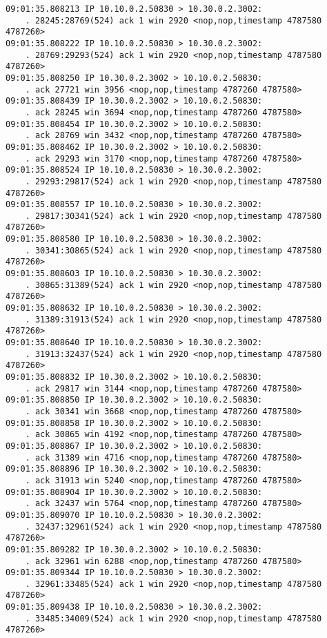 \documentclass[a4paper,12pt]{article}
\begin{document}
\begin{Verbatim}
09:01:35.808213 IP 10.10.0.2.50830 > 10.30.0.2.3002: 
    . 28245:28769(524) ack 1 win 2920 <nop,nop,timestamp 4787580 4787260>
09:01:35.808222 IP 10.10.0.2.50830 > 10.30.0.2.3002: 
    . 28769:29293(524) ack 1 win 2920 <nop,nop,timestamp 4787580 4787260>
09:01:35.808250 IP 10.30.0.2.3002 > 10.10.0.2.50830: 
    . ack 27721 win 3956 <nop,nop,timestamp 4787260 4787580>
09:01:35.808439 IP 10.30.0.2.3002 > 10.10.0.2.50830: 
    . ack 28245 win 3694 <nop,nop,timestamp 4787260 4787580>
09:01:35.808454 IP 10.30.0.2.3002 > 10.10.0.2.50830: 
    . ack 28769 win 3432 <nop,nop,timestamp 4787260 4787580>
09:01:35.808462 IP 10.30.0.2.3002 > 10.10.0.2.50830: 
    . ack 29293 win 3170 <nop,nop,timestamp 4787260 4787580>
09:01:35.808524 IP 10.10.0.2.50830 > 10.30.0.2.3002: 
    . 29293:29817(524) ack 1 win 2920 <nop,nop,timestamp 4787580 4787260>
09:01:35.808557 IP 10.10.0.2.50830 > 10.30.0.2.3002: 
    . 29817:30341(524) ack 1 win 2920 <nop,nop,timestamp 4787580 4787260>
09:01:35.808580 IP 10.10.0.2.50830 > 10.30.0.2.3002: 
    . 30341:30865(524) ack 1 win 2920 <nop,nop,timestamp 4787580 4787260>
09:01:35.808603 IP 10.10.0.2.50830 > 10.30.0.2.3002: 
    . 30865:31389(524) ack 1 win 2920 <nop,nop,timestamp 4787580 4787260>
09:01:35.808632 IP 10.10.0.2.50830 > 10.30.0.2.3002: 
    . 31389:31913(524) ack 1 win 2920 <nop,nop,timestamp 4787580 4787260>
09:01:35.808640 IP 10.10.0.2.50830 > 10.30.0.2.3002: 
    . 31913:32437(524) ack 1 win 2920 <nop,nop,timestamp 4787580 4787260>
09:01:35.808832 IP 10.30.0.2.3002 > 10.10.0.2.50830: 
    . ack 29817 win 3144 <nop,nop,timestamp 4787260 4787580>
09:01:35.808850 IP 10.30.0.2.3002 > 10.10.0.2.50830: 
    . ack 30341 win 3668 <nop,nop,timestamp 4787260 4787580>
09:01:35.808858 IP 10.30.0.2.3002 > 10.10.0.2.50830: 
    . ack 30865 win 4192 <nop,nop,timestamp 4787260 4787580>
09:01:35.808867 IP 10.30.0.2.3002 > 10.10.0.2.50830: 
    . ack 31389 win 4716 <nop,nop,timestamp 4787260 4787580>
09:01:35.808896 IP 10.30.0.2.3002 > 10.10.0.2.50830: 
    . ack 31913 win 5240 <nop,nop,timestamp 4787260 4787580>
09:01:35.808904 IP 10.30.0.2.3002 > 10.10.0.2.50830: 
    . ack 32437 win 5764 <nop,nop,timestamp 4787260 4787580>
09:01:35.809070 IP 10.10.0.2.50830 > 10.30.0.2.3002: 
    . 32437:32961(524) ack 1 win 2920 <nop,nop,timestamp 4787580 4787260>
09:01:35.809282 IP 10.30.0.2.3002 > 10.10.0.2.50830: 
    . ack 32961 win 6288 <nop,nop,timestamp 4787260 4787580>
09:01:35.809344 IP 10.10.0.2.50830 > 10.30.0.2.3002: 
    . 32961:33485(524) ack 1 win 2920 <nop,nop,timestamp 4787580 4787260>
09:01:35.809438 IP 10.10.0.2.50830 > 10.30.0.2.3002: 
    . 33485:34009(524) ack 1 win 2920 <nop,nop,timestamp 4787580 4787260>

\end{Verbatim}
\end{document}
